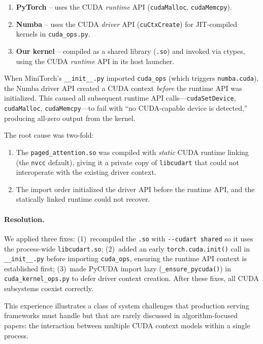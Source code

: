 \documentclass{article}
\begin{document}
\begin{enumerate}
    \item \textbf{PyTorch} -- uses the CUDA \emph{runtime} API (\texttt{cudaMalloc}, \texttt{cudaMemcpy}).
    \item \textbf{Numba} -- uses the CUDA \emph{driver} API (\texttt{cuCtxCreate}) for JIT-compiled kernels in \texttt{cuda\_ops.py}.
    \item \textbf{Our kernel} -- compiled as a shared library (\texttt{.so}) and invoked via ctypes, using the CUDA \emph{runtime} API in its host launcher.
\end{enumerate}

When MiniTorch's \texttt{\_\_init\_\_.py} imported \texttt{cuda\_ops} (which triggers \texttt{numba.cuda}), the Numba driver API created a CUDA context \emph{before} the runtime API was initialized.
This caused all subsequent runtime API calls---\texttt{cudaSetDevice}, \texttt{cudaMalloc}, \texttt{cudaMemcpy}---to fail with ``no CUDA-capable device is detected,'' producing all-zero output from the kernel.

The root cause was two-fold:
\begin{enumerate}
    \item The \texttt{paged\_attention.so} was compiled with \emph{static} CUDA runtime linking (the \texttt{nvcc} default), giving it a private copy of \texttt{libcudart} that could not interoperate with the existing driver context.
    \item The import order initialized the driver API before the runtime API, and the statically linked runtime could not recover.
\end{enumerate}

\paragraph{Resolution.}
We applied three fixes:
(1)~recompiled the \texttt{.so} with \texttt{-{}-cudart~shared} so it uses the process-wide \texttt{libcudart.so};
(2)~added an early \texttt{torch.cuda.init()} call in \texttt{\_\_init\_\_.py} before importing \texttt{cuda\_ops}, ensuring the runtime API context is established first;
(3)~made PyCUDA import lazy (\texttt{\_ensure\_pycuda()}) in \texttt{cuda\_kernel\_ops.py} to defer driver context creation.
After these fixes, all CUDA subsystems coexist correctly.

This experience illustrates a class of system challenges that production serving frameworks must handle but that are rarely discussed in algorithm-focused papers: the interaction between multiple CUDA context models within a single process.
\end{document}
